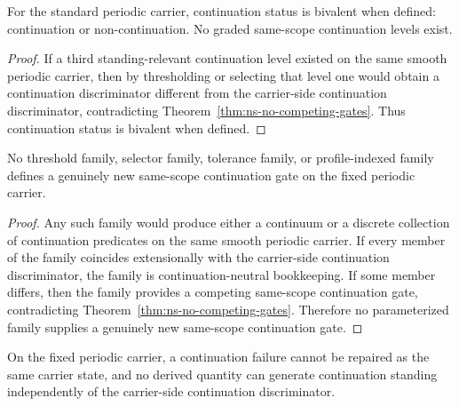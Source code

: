 \begin{corollary}
\label{cor:ns-binary-continuation-status}
For the standard periodic carrier, continuation status is bivalent when defined: continuation or
non-continuation. No graded same-scope continuation levels exist.
\end{corollary}

\begin{proof}
If a third standing-relevant continuation level existed on the same smooth periodic carrier, then by
thresholding or selecting that level one would obtain a continuation discriminator different from the
carrier-side continuation discriminator, contradicting Theorem~\ref{thm:ns-no-competing-gates}.
Thus continuation status is bivalent when defined.
\end{proof}

\begin{corollary}
\label{cor:ns-no-parameterized-gate}
No threshold family, selector family, tolerance family, or profile-indexed family defines a genuinely
new same-scope continuation gate on the fixed periodic carrier.
\end{corollary}

\begin{proof}
Any such family would produce either a continuum or a discrete collection of continuation
predicates on the same smooth periodic carrier. If every member of the family coincides
extensionally with the carrier-side continuation discriminator, the family is continuation-neutral
bookkeeping. If some member differs, then the family provides a competing same-scope continuation
gate, contradicting Theorem~\ref{thm:ns-no-competing-gates}. Therefore no parameterized family
supplies a genuinely new same-scope continuation gate.
\end{proof}

\begin{theorem}
\label{thm:ns-no-repair-generator}
On the fixed periodic carrier, a continuation failure cannot be repaired as the same carrier state, and
no derived quantity can generate continuation standing independently of the carrier-side continuation
discriminator.
\end{theorem}

